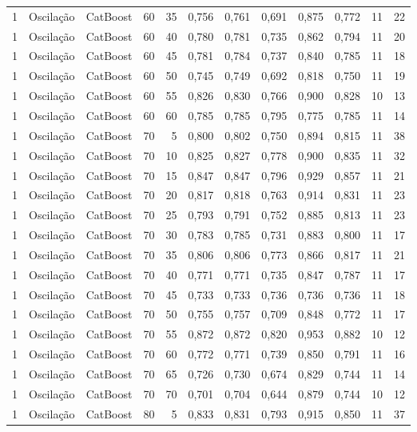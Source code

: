 \begin{longtable}{@{}rllrrrrrrrrr@{}}
1 & Oscilação & CatBoost & 60 & 35 & 0,756 & 0,761 & 0,691 & 0,875 & 0,772 & 11 & 22 \\
1 & Oscilação & CatBoost & 60 & 40 & 0,780 & 0,781 & 0,735 & 0,862 & 0,794 & 11 & 20 \\
1 & Oscilação & CatBoost & 60 & 45 & 0,781 & 0,784 & 0,737 & 0,840 & 0,785 & 11 & 18 \\
1 & Oscilação & CatBoost & 60 & 50 & 0,745 & 0,749 & 0,692 & 0,818 & 0,750 & 11 & 19 \\
1 & Oscilação & CatBoost & 60 & 55 & 0,826 & 0,830 & 0,766 & 0,900 & 0,828 & 10 & 13 \\
1 & Oscilação & CatBoost & 60 & 60 & 0,785 & 0,785 & 0,795 & 0,775 & 0,785 & 11 & 14 \\
1 & Oscilação & CatBoost & 70 & 5 & 0,800 & 0,802 & 0,750 & 0,894 & 0,815 & 11 & 38 \\
1 & Oscilação & CatBoost & 70 & 10 & 0,825 & 0,827 & 0,778 & 0,900 & 0,835 & 11 & 32 \\
1 & Oscilação & CatBoost & 70 & 15 & 0,847 & 0,847 & 0,796 & 0,929 & 0,857 & 11 & 21 \\
1 & Oscilação & CatBoost & 70 & 20 & 0,817 & 0,818 & 0,763 & 0,914 & 0,831 & 11 & 23 \\
1 & Oscilação & CatBoost & 70 & 25 & 0,793 & 0,791 & 0,752 & 0,885 & 0,813 & 11 & 23 \\
1 & Oscilação & CatBoost & 70 & 30 & 0,783 & 0,785 & 0,731 & 0,883 & 0,800 & 11 & 17 \\
1 & Oscilação & CatBoost & 70 & 35 & 0,806 & 0,806 & 0,773 & 0,866 & 0,817 & 11 & 21 \\
1 & Oscilação & CatBoost & 70 & 40 & 0,771 & 0,771 & 0,735 & 0,847 & 0,787 & 11 & 17 \\
1 & Oscilação & CatBoost & 70 & 45 & 0,733 & 0,733 & 0,736 & 0,736 & 0,736 & 11 & 18 \\
1 & Oscilação & CatBoost & 70 & 50 & 0,755 & 0,757 & 0,709 & 0,848 & 0,772 & 11 & 17 \\
1 & Oscilação & CatBoost & 70 & 55 & 0,872 & 0,872 & 0,820 & 0,953 & 0,882 & 10 & 12 \\
1 & Oscilação & CatBoost & 70 & 60 & 0,772 & 0,771 & 0,739 & 0,850 & 0,791 & 11 & 16 \\
1 & Oscilação & CatBoost & 70 & 65 & 0,726 & 0,730 & 0,674 & 0,829 & 0,744 & 11 & 14 \\
1 & Oscilação & CatBoost & 70 & 70 & 0,701 & 0,704 & 0,644 & 0,879 & 0,744 & 10 & 12 \\
1 & Oscilação & CatBoost & 80 & 5 & 0,833 & 0,831 & 0,793 & 0,915 & 0,850 & 11 & 37 \\

\end{longtable}
